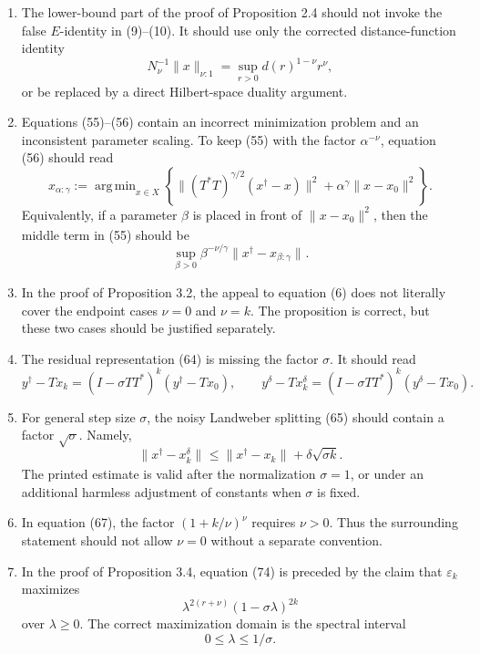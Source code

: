 \documentclass[10pt,a4paper]{article}
\DeclareMathOperator*{\argmin}{arg\,min}
\newcommand{\norm}[2]{     \| #1       \|_{ #2 }}
\begin{document}
\begin{enumerate}
\item[\textup{(E8)}]
The lower-bound part of the proof of Proposition 2.4 should not invoke the false $E$-identity in (9)--(10).  It should use only the corrected distance-function identity
\[
    N_\nu^{-1}\norm{x}{\nu:1}
    =
    \sup_{r>0}d(r)^{1-\nu}r^\nu,
\]
or be replaced by a direct Hilbert-space duality argument.

\item[\textup{(E9)}]
Equations (55)--(56) contain an incorrect minimization problem and an inconsistent parameter scaling.  To keep (55) with the factor $\alpha^{-\nu}$, equation (56) should read
\[
    x_{\alpha:\gamma}
    :=
    \argmin_{x\in X}
    \left\{
        \norm{(T^*T)^{\gamma/2}(x^\dag-x)}{}^2
        +
        \alpha^\gamma\norm{x-x_0}{}^2
    \right\}.
\]
Equivalently, if a parameter $\beta$ is placed in front of $\norm{x-x_0}{}^2$, then the middle term in (55) should be
\[
    \sup_{\beta>0}
    \beta^{-\nu/\gamma}
    \norm{x^\dag-x_{\beta:\gamma}}{} .
\]

\item[\textup{(E10)}]
In the proof of Proposition 3.2, the appeal to equation (6) does not literally cover the endpoint cases $\nu=0$ and $\nu=k$.  The proposition is correct, but these two cases should be justified separately.

\item[\textup{(E11)}]
The residual representation (64) is missing the factor $\sigma$.  It should read
\[
    y^\dag-Tx_k
    =
    (I-\sigma TT^*)^k(y^\dag-Tx_0),
    \qquad
    y^\delta-Tx_k^\delta
    =
    (I-\sigma TT^*)^k(y^\delta-Tx_0).
\]

\item[\textup{(E12)}]
For general step size $\sigma$, the noisy Landweber splitting (65) should contain a factor $\sqrt{\sigma}$.  Namely,
\[
    \norm{x^\dag-x_k^\delta}{}
    \le
    \norm{x^\dag-x_k}{}
    +
    \delta\sqrt{\sigma k}.
\]
The printed estimate is valid after the normalization $\sigma=1$, or under an additional harmless adjustment of constants when $\sigma$ is fixed.

\item[\textup{(E13)}]
In equation (67), the factor $(1+k/\nu)^\nu$ requires $\nu>0$.  Thus the surrounding statement should not allow $\nu=0$ without a separate convention.

\item[\textup{(E14)}]
In the proof of Proposition 3.4, equation (74) is preceded by the claim that $\varepsilon_k$ maximizes
\[
    \lambda^{2(r+\nu)}(1-\sigma\lambda)^{2k}
\]
over $\lambda\ge0$.  The correct maximization domain is the spectral interval
\[
    0\le\lambda\le1/\sigma .
\]


\end{enumerate}
\end{document}
